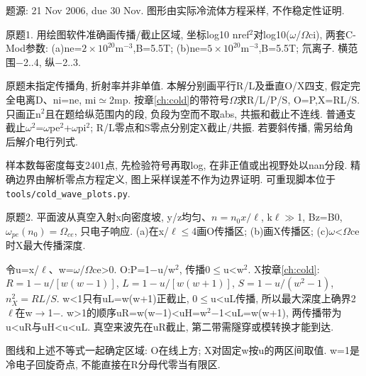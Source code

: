 题源: 21 Nov 2006, due 30 Nov. 图形由实际冷流体方程采样, 不作稳定性证明.
\begin{exercise}\label{ex:06-8-1}
原题1. 用绘图软件准确画传播/截止区域, 坐标log10 nref\ensuremath{{}^{2}}对log10(\ensuremath{\omega}/\ensuremath{\Omega}ci), 两套C-Mod参数: (a)ne=$2\times10^{20}$m$^{-3}$,B=5.5T; (b)ne=$5\times10^{20}$m$^{-3}$,B=5.5T; 氘离子. 横范围\ensuremath{-}2..4, 纵\ensuremath{-}2..3.
\end{exercise}
\begin{solution}
原题未指定传播角, 折射率并非单值. 本解分别画平行R/L及垂直O/X四支, 假定完全电离D、ni=ne, mi\ensuremath{\simeq}2mp. 按章\ref{ch:cold}的带符号\ensuremath{\Omega}求R/L/P/S, O=P,X=RL/S. 只画正n\ensuremath{{}^{2}}且在题给纵范围内的段, 负段为空而不取abs, 共振和截止不连线. 普通支截止\ensuremath{\omega}\ensuremath{{}^{2}}=\ensuremath{\omega}pe\ensuremath{{}^{2}}+\ensuremath{\omega}pi\ensuremath{{}^{2}}; R/L零点和S零点分别定X截止/共振. 若要斜传播, 需另给角后解介电行列式.

样本数每密度每支2401点, 先检验符号再取log, 在非正值或出视野处以nan分段. 精确边界由解析零点方程定义, 图上采样误差不作为边界证明. 可重现脚本位于\texttt{tools/cold\_wave\_plots.py}.
\end{solution}
\begin{exercise}\label{ex:06-8-2}
原题2. 平面波从真空入射x向密度坡, y/z均匀、$n=n_0x/\ell$, k\ensuremath{\ell}\ensuremath{\gg}1, Bz=B0, $\omega_{pe}(n_0)=\Omega_{ce}$, 只电子响应. (a)在x/\ensuremath{\ell}\ensuremath{\le}4画O传播区; (b)画X传播区; (c)\ensuremath{\omega}<\ensuremath{\Omega}ce时X最大传播深度.
\end{exercise}
\begin{solution}
令u=x/\ensuremath{\ell}、w=\ensuremath{\omega}/\ensuremath{\Omega}ce>0. O:P=1\ensuremath{-}u/w\ensuremath{{}^{2}}, 传播0\ensuremath{\le}u<w\ensuremath{{}^{2}}. X按章\ref{ch:cold}:
$R=1-u/[w(w-1)]$, $L=1-u/[w(w+1)]$, $S=1-u/(w^2-1)$, $n_X^2=RL/S$. w<1只有uL=w(w+1)正截止, 0\ensuremath{\le}u<uL传播, 所以最大深度上确界2\ensuremath{\ell}在w\ensuremath{\to}1\ensuremath{-}. w>1的顺序uR=w(w\ensuremath{-}1)<uH=w\ensuremath{{}^{2}}\ensuremath{-}1<uL=w(w+1), 两传播带为u<uR与uH<u<uL. 真空来波先在uR截止, 第二带需隧穿或模转换才能到达.
\begin{center}\end{center}
图线和上述不等式一起确定区域: O在线上方; X对固定w按u的两区间取值. w=1是冷电子回旋奇点, 不能直接在R分母代零当有限区.
\end{solution}
